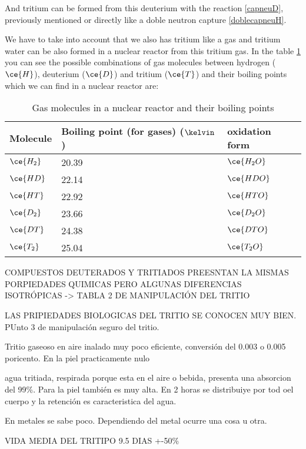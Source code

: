 And tritium can be formed from this deuterium with the reaction \eqref{capneuD}, previously mentioned or directly like a doble neutron capture \eqref{doblecapneuH}.

We have to take into account that we also has tritium like a gas and tritium water can be also formed in a nuclear reactor from this tritium gas. In the table \ref{GasMolecules} you can see the possible combinations of gas molecules between hydrogen ($\ce{H}$), deuterium ($\ce{D}$)  and tritium ($\ce{T}$) and their boiling points which we can find in a nuclear reactor are:

\begin{table}[htbp]
\begin{center}
\begin{tabular}{|l|l|l|}
\hline
Molecule & Boiling point (for gases) ($\kelvin$) & oxidation form\\
\hline \hline \hline
$\ce{H_2}$ & 20.39 & $\ce{H_2 O}$ \\ \hline
$\ce{HD}$ & 22.14 & $\ce{HDO}$ \\ \hline
$\ce{HT}$ & 22.92 & $\ce{HTO}$ \\ \hline
$\ce{D_2}$ & 23.66 & $\ce{D_2 O}$ \\ \hline
$\ce{DT}$ & 24.38 & $\ce{DTO}$ \\ \hline
$\ce{T_2}$ & 25.04 & $\ce{T_2 O}$ \\ \hline
\end{tabular}
\caption{Gas molecules in a nuclear reactor and their boiling points}
\label{GasMolecules}
\end{center}
\end{table} 

COMPUESTOS DEUTERADOS Y TRITIADOS PREESNTAN LA MISMAS PORPIEDADES QUIMICAS PERO ALGUNAS DIFERENCIAS ISOTRÓPICAS -> TABLA 2 DE MANIPULACIÓN DEL TRITIO

LAS PRIPIEDADES BIOLOGICAS DEL TRITIO SE CONOCEN MUY BIEN. PUnto 3 de manipulación seguro del tritio.

Tritio gaseoso en aire inalado muy poco eficiente, conversión del 0.003 o 0.005 poricento. En la piel practicamente nulo

agua tritiada, respirada porque esta en el aire o bebida, presenta una absorcion del 99\%. Para la piel también es muy alta. En 2 horas se distribuiye por tod oel cuerpo y la retención es caracteristica del agua.

En metales se sabe poco. Dependiendo del metal ocurre una cosa u otra.

VIDA MEDIA DEL TRITIPO 9.5 DIAS +-50\%



